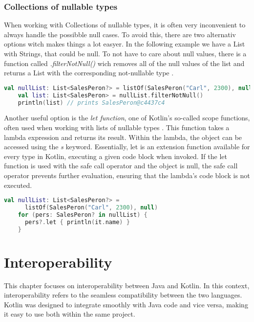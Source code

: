 \documentclass[a4paper, 11pt]{article}
\begin{document}
\subsubsection{Collections of nullable types}
  When working with Collections of nullable types, it is often very inconvenient to always handle the possibble null cases. To avoid this, there are two alternativ options witch makes things a lot easyer.
  In the following example we have a List with Strings, that could be null. To not have to care about null values, there is a function called \textit{.filterNotNull()} wich removes all of the null values of the list and returns a List with the corresponding not-nullable type \cite{nullsafety-collections}.
  \begin{lstlisting}[language=Kotlin]
    val nullList: List<SalesPeron?> = listOf(SalesPeron("Carl", 2300), null)
    val list: List<SalesPeron> = nullList.filterNotNull()
    println(list) // prints SalesPeron@c4437c4
  \end{lstlisting}

  Another useful option is the \textit{let function}, one of Kotlin's so-called scope functions, often used when working with lists of nullable types \cite{nullsafety-letfunc}. This function takes a lambda expression and returns its result. Within the lambda, the object can be accessed using the \textit{s} keyword. Essentially, let is an extension function available for every type in Kotlin, executing a given code block when invoked. If the let function is used with the safe call operator and the object is null, the safe call operator prevents further evaluation, ensuring that the lambda's code block is not executed.
  \begin{lstlisting}[language=Kotlin]
    val nullList: List<SalesPeron?> =
      listOf(SalesPeron("Carl", 2300), null)
    for (pers: SalesPeron? in nullList) {
      pers?.let { println(it.name) }
    }
  \end{lstlisting}


\section{Interoperability}
  This chapter focuses on interoperability between Java and Kotlin. In this context, interoperability refers to the seamless compatibility between the two languages. Kotlin was designed to integrate smoothly with Java code and vice versa, making it easy to use both within the same project.
\end{document}
